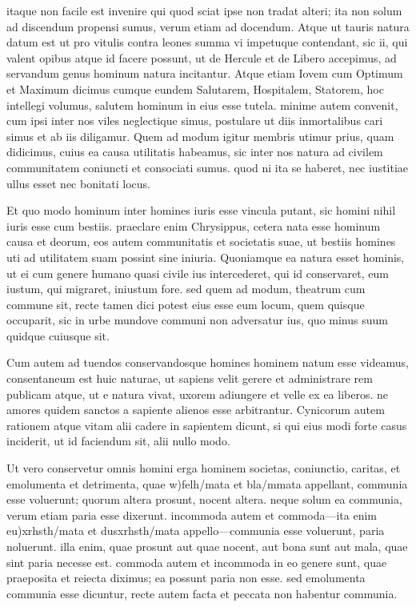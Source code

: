  itaque non facile est invenire qui quod sciat ipse non tradat alteri; ita non solum ad discendum propensi sumus, verum etiam ad docendum. Atque ut tauris natura datum est ut pro vitulis contra leones summa vi impetuque contendant, sic ii, qui valent opibus atque id facere possunt, ut de Hercule et de Libero accepimus, ad servandum genus hominum natura incitantur. Atque etiam Iovem cum Optimum et Maximum dicimus cumque eundem Salutarem, Hospitalem, Statorem, hoc intellegi volumus, salutem hominum in eius esse tutela. minime autem convenit, cum ipsi inter nos viles neglectique simus, postulare ut diis inmortalibus cari simus et ab iis diligamur. Quem ad modum igitur membris utimur prius, quam didicimus, cuius ea causa utilitatis habeamus, sic inter nos natura ad civilem communitatem coniuncti et consociati sumus. quod ni ita se haberet, nec iustitiae ullus esset nec bonitati locus.

 Et quo modo hominum inter homines iuris esse vincula putant, sic homini nihil iuris esse cum bestiis. praeclare enim Chrysippus, cetera nata esse hominum causa et deorum, eos autem communitatis et societatis suae, ut bestiis homines uti ad utilitatem suam possint sine iniuria. Quoniamque ea natura esset hominis, ut ei cum genere humano quasi civile ius intercederet, qui id conservaret, eum iustum, qui migraret, iniustum fore. sed quem ad modum, theatrum cum commune sit, recte tamen dici potest eius esse eum locum, quem quisque occuparit, sic in urbe mundove communi non adversatur ius, quo minus suum quidque cuiusque sit.

 Cum autem ad tuendos conservandosque homines hominem natum esse videamus, consentaneum est huic naturae, ut sapiens velit gerere et administrare rem publicam atque, ut e natura vivat, uxorem adiungere et velle ex ea liberos. ne amores quidem sanctos a sapiente alienos esse arbitrantur. Cynicorum autem rationem atque vitam alii cadere in sapientem dicunt, si qui eius modi forte casus inciderit, ut id faciendum sit, alii nullo modo.

 Ut vero conservetur omnis homini erga hominem societas, coniunctio, caritas, et emolumenta et detrimenta, quae w)felh/mata et bla/mmata appellant, communia esse voluerunt; quorum altera prosunt, nocent altera. neque solum ea communia, verum etiam paria esse dixerunt. incommoda autem et commoda—ita enim eu)xrhsth/mata et dusxrhsth/mata appello—communia esse voluerunt, paria noluerunt. illa enim, quae prosunt aut quae nocent, aut bona sunt aut mala, quae sint paria necesse est. commoda autem et incommoda in eo genere sunt, quae praeposita et reiecta diximus; ea possunt paria non esse. sed emolumenta communia esse dicuntur, recte autem facta et peccata non habentur communia.

